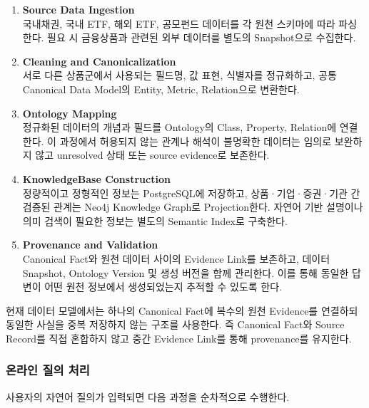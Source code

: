\documentclass[11pt,a4paper]{article}
\begin{document}
\begin{enumerate}
    \item \textbf{Source Data Ingestion}\\
    국내채권, 국내 ETF, 해외 ETF, 공모펀드 데이터를
    각 원천 스키마에 따라 파싱한다.
    필요 시 금융상품과 관련된 외부 데이터를 별도의 Snapshot으로 수집한다.

    \item \textbf{Cleaning and Canonicalization}\\
    서로 다른 상품군에서 사용되는 필드명, 값 표현, 식별자를 정규화하고,
    공통 Canonical Data Model의 Entity, Metric, Relation으로 변환한다.

    \item \textbf{Ontology Mapping}\\
    정규화된 데이터의 개념과 필드를 Ontology의 Class,
    Property, Relation에 연결한다.
    이 과정에서 허용되지 않는 관계나 해석이 불명확한 데이터는
    임의로 보완하지 않고 unresolved 상태 또는 source evidence로 보존한다.

    \item \textbf{KnowledgeBase Construction}\\
    정량적이고 정형적인 정보는 PostgreSQL에 저장하고,
    상품·기업·증권·기관 간 검증된 관계는 Neo4j Knowledge Graph로 Projection한다.
    자연어 기반 설명이나 의미 검색이 필요한 정보는 별도의 Semantic Index로 구축한다.

    \item \textbf{Provenance and Validation}\\
    Canonical Fact와 원천 데이터 사이의 Evidence Link를 보존하고,
    데이터 Snapshot, Ontology Version 및 생성 버전을 함께 관리한다.
    이를 통해 동일한 답변이 어떤 원천 정보에서 생성되었는지 추적할 수 있도록 한다.
\end{enumerate}

현재 데이터 모델에서는 하나의 Canonical Fact에
복수의 원천 Evidence를 연결하되 동일한 사실을 중복 저장하지 않는 구조를 사용한다.
즉 Canonical Fact와 Source Record를 직접 혼합하지 않고
중간 Evidence Link를 통해 provenance를 유지한다.

\subsubsection{온라인 질의 처리}

사용자의 자연어 질의가 입력되면 다음 과정을 순차적으로 수행한다.
\end{document}
